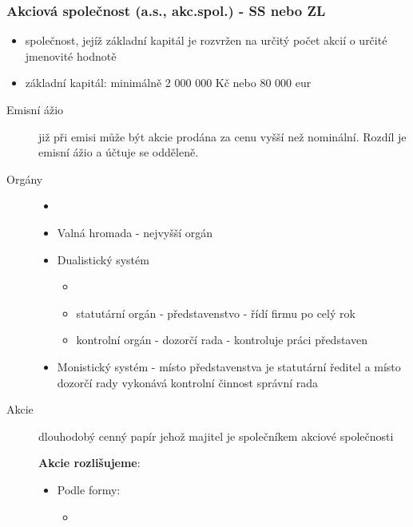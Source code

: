         \subsubsection{Akciová společnost (a.s., akc.spol.) - SS nebo ZL}
            \begin{itemize}
                \item společnost, jejíž základní kapitál je rozvržen na určitý počet akcií o určité jmenovité hodnotě
                \item základní kapitál: minimálně 2 000 000 Kč nebo 80 000 eur
            \end{itemize}
            \begin{description}
                \item[Emisní ážio] již při emisi může být akcie prodána za cenu vyšší než nominální. Rozdíl je emisní ážio a účtuje se odděleně.
                \item[Orgány]
                    \begin{itemize}
                        \item []
                        \item Valná hromada - nejvyšší orgán
                        \item Dualistický systém
                            \begin{itemize}
                                \item []
                                \item statutární orgán - představenstvo - řídí firmu po celý rok
                                \item kontrolní orgán - dozorčí rada - kontroluje práci představen
                            \end{itemize}
                        \item Monistický systém - místo představenstva je statutární ředitel a místo dozorčí rady vykonává kontrolní činnost správní rada
                    \end{itemize}
                \item[Akcie] dlouhodobý cenný papír jehož majitel je společníkem akciové společnosti \par \textbf{Akcie rozlišujeme}: 
                    \begin{itemize}
                        \item Podle formy:
                            \begin{itemize}
                                \item []

\end{itemize}
\end{itemize}
\end{description}
